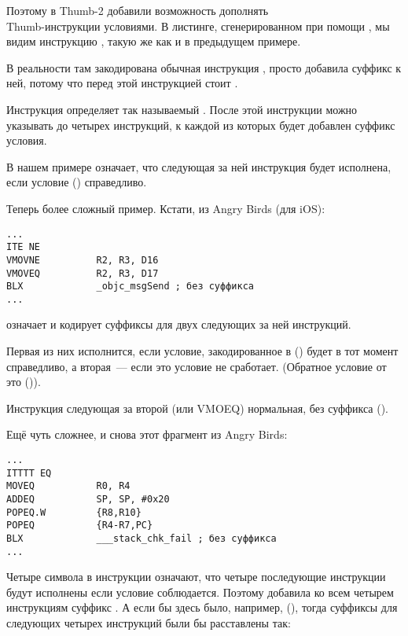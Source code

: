 Поэтому в Thumb-2 добавили возможность дополнять \\
Thumb-инструкции условиями.
В листинге, сгенерированном при помощи \IDA, мы видим инструкцию , 
такую же как и в предыдущем примере.

В реальности там закодирована обычная инструкция , просто \IDA добавила суффикс  к ней, 
потому что перед этой инструкцией стоит .

\label{ARM_Thumb_IT}
Инструкция  определяет так называемый . 
После этой инструкции можно указывать до четырех инструкций, 
к каждой из которых будет добавлен суффикс условия.

В нашем примере  означает,
что следующая за ней инструкция будет исполнена, если условие
 () справедливо.

Теперь более сложный пример. Кстати, из 
Angry Birds (для iOS):

\begin{lstlisting}[caption=Angry Birds Classic,style=customasmARM]
...
ITE NE
VMOVNE          R2, R3, D16
VMOVEQ          R2, R3, D17
BLX             _objc_msgSend ; без суффикса
...
\end{lstlisting}

 означает  
и кодирует суффиксы для двух следующих за ней инструкций.

Первая из них исполнится, если условие, закодированное в  () будет в тот момент справедливо,
а вторая~--- если это условие не сработает.
(Обратное условие от  это  ()).

Инструкция следующая за второй  (или VMOEQ) нормальная, без суффикса ().

Ещё чуть сложнее, и снова этот фрагмент из Angry Birds:

\begin{lstlisting}[caption=Angry Birds Classic,style=customasmARM]
...
ITTTT EQ
MOVEQ           R0, R4
ADDEQ           SP, SP, #0x20
POPEQ.W         {R8,R10}
POPEQ           {R4-R7,PC}
BLX             ___stack_chk_fail ; без суффикса
...
\end{lstlisting}

Четыре символа  в инструкции означают, что четыре последующие инструкции будут исполнены если условие соблюдается.
Поэтому \IDA добавила ко всем четырем инструкциям суффикс . 
А если бы здесь было, например,
 (), 
тогда суффиксы для следующих четырех инструкций были бы расставлены так:


